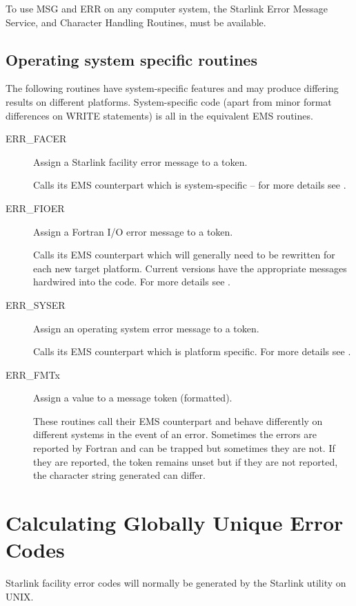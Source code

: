 \documentclass[twoside,11pt]{starlink}
\begin{document}
To use MSG and ERR on any computer system, the Starlink Error Message Service,
 
and Character Handling Routines,
 
must be available.


\subsection{Operating system specific routines \label{dep_sect}}
The following routines have system-specific features and may produce differing
results on different platforms. System-specific code (apart from minor format
differences on WRITE statements) is all in the equivalent EMS routines.
\begin{description}
\item [ERR\_FACER] Assign a Starlink facility error message to a token.

Calls its EMS counterpart which is system-specific -- for more details see
.
\item [ERR\_FIOER] Assign a Fortran I/O error message to a token.

Calls its EMS counterpart which will generally need to be rewritten for each
new target platform.
Current versions have the appropriate messages hardwired into the code.
For more details see .
\item [ERR\_SYSER] Assign an operating system error message to a token.

Calls its EMS counterpart which is platform specific.
For more details see .
\item [ERR\_FMTx] Assign a value to a message token (formatted).

These routines call their EMS counterpart and behave differently on different
systems in the event of an error.
Sometimes the errors are reported by Fortran and can be trapped but
sometimes they are not. If they are reported, the token remains unset but
if they are not reported, the character string generated can differ.
\end {description}

\section{Calculating Globally Unique Error Codes \label{stat_sect}}
Starlink facility error codes will normally be generated by the Starlink
 utility on UNIX.
\end{document}
